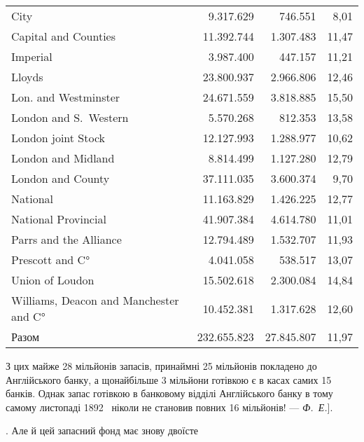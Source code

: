 {\begin{tabularx}{\textwidth}{X r r r}
City \dotfill{}                                    & \num{9.317.629}  & \num{746.551}  & 8,01 \\
Capital and Counties \dotfill{}                   & \num{11.392.744} & \num{1.307.483} & 11,47 \\
Imperial \dotfill{}                               & \num{3.987.400}  & \num{447.157}  & 11,21 \\
Lloyds \dotfill{}                                 & \num{23.800.937} & \num{2.966.806} & 12,46 \\
Lon. and Westminster \dotfill{}                   & \num{24.671.559} & \num{3.818.885} & 15,50 \\
London and S.~Western \dotfill{}                  & \num{5.570.268}  & \num{812.353}  & 13,58 \\
London joint Stock \dotfill{}                     & \num{12.127.993} & \num{1.288.977} & 10,62 \\
London and Midland \dotfill{}                     & \num{8.814.499}  & \num{1.127.280} & 12,79 \\
London and County \dotfill{}                      & \num{37.111.035} & \num{3.600.374} & 9,70 \\
National \dotfill{}                               & \num{11.163.829} & \num{1.426.225} & 12,77 \\
National Provincial \dotfill{}                     & \num{41.907.384} & \num{4.614.780} & 11,01 \\
Parrs and the Alliance \dotfill{}                 & \num{12.794.489} & \num{1.532.707} & 11,93 \\
Prescott and C° \dotfill{}                        & \num{4.041.058}  & \num{538.517}  & 13,07 \\
Union of Loudon \dotfill{}                       & \num{15.502.618} & \num{2.300.084} & 14,84 \\
Williams, Deacon and Manchester and C°\dotfill{} & \num{10.452.381} & \num{1.317.628} & 12,60 \\
\cmidrule(lr){1-4}
Разом                                  & \num{232.655.823} & \num{27.845.807} & 11,97

  \end{tabularx}

\noindent{}З цих майже 28 мільйонів запасів, принаймні 25 мільйонів покладено до Англійського банку, а
щонайбільше 3 мільйони готівкою є в касах самих 15 банків. Однак запас готівкою в банковому відділі
Англійського банку в тому самому листопаді 1892~ ніколи не становив повних 16 мільйонів! — \emph{Ф.~Е.}].
}. Але й цей запасний фонд має знову двоїсте
